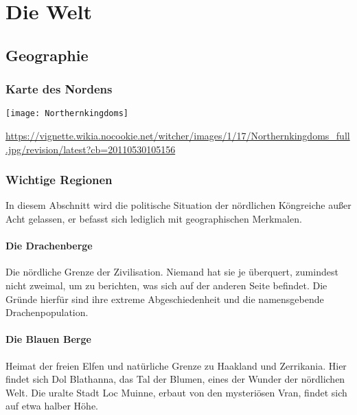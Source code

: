 \documentclass[parskip=full,11pt,%
footheight=38pt]{scrreport}
\title{\thetitle}
\author{\href{mailto:TurambarOfManyNames@outlook.com}{Turambar of Many Names}}
\begin{document}
\makeatletter





\maketitle
\setcounter{tocdepth}{1}
\tableofcontents

\iffalse %
	\chapter{Die Welt}

	\section{Geographie}
	\subsection{Karte des Nordens}
	\texttt{[image: Northernkingdoms]}
	\begin{tiny}\url{https://vignette.wikia.nocookie.net/witcher/images/1/17/Northernkingdoms_full.jpg/revision/latest?cb=20110530105156}\end{tiny}
	\subsection{Wichtige Regionen}
	In diesem Abschnitt wird die politische Situation der nördlichen Köngreiche außer Acht gelassen, er befasst sich lediglich mit geographischen Merkmalen.
	\subsubsection{Die Drachenberge}
	Die nördliche Grenze der Zivilisation. Niemand hat sie je überquert, zumindest nicht zweimal, um zu berichten, was sich auf der anderen Seite befindet. Die Gründe hierfür sind ihre extreme Abgeschiedenheit und die namensgebende Drachenpopulation.

	\subsubsection{Die Blauen Berge}
	Heimat der freien Elfen und natürliche Grenze zu Haakland und Zerrikania. Hier findet sich Dol Blathanna, das Tal der Blumen, eines der Wunder der nördlichen Welt. Die uralte Stadt Loc Muinne, erbaut von den mysteriösen Vran, findet sich auf etwa halber Höhe.
\end{document}
